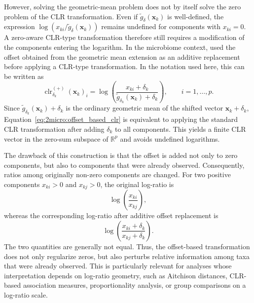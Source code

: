 However, solving the geometric-mean problem does not by itself solve the zero problem of the CLR transformation. Even if $\tilde{g}_{\delta}(\mathbf{x}_k)$ is well-defined, the expression $\log(x_{ki}/\tilde{g}_{\delta}(\mathbf{x}_k))$ remains undefined for components with $x_{ki}=0$. A zero-aware CLR-type transformation therefore still requires a modification of the components entering the logarithm. In the microbiome context, \citet{mishra2025variational} used the offset obtained from the geometric mean extension as an additive replacement before applying a CLR-type transformation. In the notation used here, this can be written as
\begin{equation}
\operatorname{clr}_{\delta_k}^{(+)}(\mathbf{x}_k)_i=
\log\left(\frac{x_{ki}+\delta_k}{\tilde{g}_{\delta_k}(\mathbf{x}_k)+\delta_k}\right),
\qquad i=1,\ldots,p.
\label{eq:2micro:offset_based_clr}
\end{equation}
Since $\tilde{g}_{\delta_k}(\mathbf{x}_k)+\delta_k$ is the ordinary geometric mean of the shifted vector $\mathbf{x}_k+\delta_k$, Equation~\eqref{eq:2micro:offset_based_clr} is equivalent to applying the standard CLR transformation after adding $\delta_k$ to all components. This yields a finite CLR vector in the zero-sum subspace of $\mathbb{R}^p$ and avoids undefined logarithms.

The drawback of this construction is that the offset is added not only to zero components, but also to components that were already observed. Consequently, ratios among originally non-zero components are changed. For two positive components $x_{ki}>0$ and $x_{kj}>0$, the original log-ratio is
\begin{equation}
\log\left(\frac{x_{ki}}{x_{kj}}\right),
\label{eq:2micro:original_positive_logratio}
\end{equation}
whereas the corresponding log-ratio after additive offset replacement is
\begin{equation}
\log\left(\frac{x_{ki}+\delta_k}{x_{kj}+\delta_k}\right).
\label{eq:2micro:offset_positive_logratio}
\end{equation}
The two quantities are generally not equal. Thus, the offset-based transformation does not only regularize zeros, but also perturbs relative information among taxa that were already observed. This is particularly relevant for analyses whose interpretation depends on log-ratio geometry, such as Aitchison distances, CLR-based association measures, proportionality analysis, or group comparisons on a log-ratio scale.

